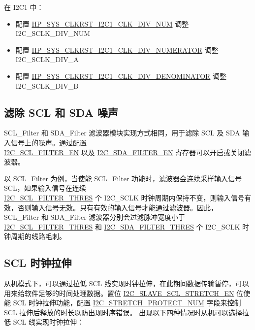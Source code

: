 \documentclass[main\_\_CN.tex]{subfiles}
\begin{document}
在 I2C1 中：
\begin{itemize}
    \item 配置 \hyperref[fielddesc:HPSYSCLKRSTI2C1CLKDIVNUM]{HP\_SYS\_CLKRST\_I2C1\_CLK\_DIV\_NUM} 调整 I2C\_SCLK\_DIV\_NUM
    \item 配置 \hyperref[fielddesc:HPSYSCLKRSTI2C1CLKDIVNUMERATOR]{HP\_SYS\_CLKRST\_I2C1\_CLK\_DIV\_NUMERATOR} 调整 I2C\_SCLK\_DIV\_A
    \item 配置 \hyperref[fielddesc:HPSYSCLKRSTI2C1CLKDIVDENOMINATOR]{HP\_SYS\_CLKRST\_I2C1\_CLK\_DIV\_DENOMINATOR} 调整 I2C\_SCLK\_DIV\_B
\end{itemize}

\subsection{滤除 SCL 和 SDA 噪声}
SCL\_Filter 和 SDA\_Filter 滤波器模块实现方式相同，用于滤除 SCL 及 SDA 输入信号上的噪声。通过配置\\\hyperref[fielddesc:I2CSCLFILTEREN]{I2C\_SCL\_FILTER\_EN} 以及 \hyperref[fielddesc:I2CSDAFILTEREN]{I2C\_SDA\_FILTER\_EN} 寄存器可以开启或关闭滤波器。

以 SCL\_Filter 为例，当使能 SCL\_Filter 功能时，滤波器会连续采样输入信号 SCL，如果输入信号在连续 \\\hyperref[fielddesc:I2CSCLFILTERTHRES]{I2C\_SCL\_FILTER\_THRES} 个 I2C\_SCLK 时钟周期内保持不变，则输入信号有效，否则输入信号无效。只有有效的输入信号才能通过滤波器。因此，SCL\_Filter 和 SDA\_Filter 滤波器分别会过滤脉冲宽度小于 \hyperref[fielddesc:I2CSCLFILTERTHRES]{I2C\_SCL\_FILTER\_THRES} 和 \hyperref[fielddesc:I2CSDAFILTERTHRES]{I2C\_SDA\_FILTER\_THRES} 个 I2C\_SCLK 时钟周期的线路毛刺。

\subsection{SCL 时钟拉伸}
从机模式下，可以通过拉低 SCL 线实现时钟拉伸，在此期间数据传输暂停，可以用来给软件足够的时间处理数据。置位 \hyperref[fielddesc:I2CSLAVESCLSTRETCHEN]{I2C\_SLAVE\_SCL\_STRETCH\_EN} 位使能 SCL 时钟拉伸功能，配置 \hyperref[fielddesc:I2CSTRETCHPROTECTNUM]{I2C\_STRETCH\_PROTECT\_NUM} 字段来控制 SCL 拉伸后释放的时长以防出现时序错误。
出现以下四种情况时从机可以选择拉低 SCL 线实现时钟拉伸：
\end{document}
